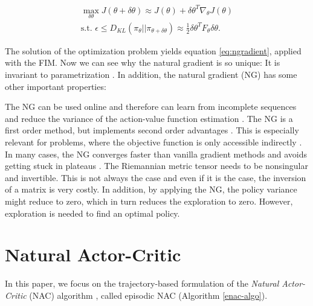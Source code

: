 \begin{align}
	\max_{\delta\theta} J(\theta + \delta\theta) \approx J(\theta) + \delta\theta^T\nabla_\theta J(\theta)\label{ng1}\\
	\text{s.t. } \epsilon \le D_{KL}(\pi_{\theta} || \pi_{\theta + \delta\theta}) \approx \tfrac{1}{2} \delta\theta^T F_\theta \delta\theta\label{ng2}.
\end{align}

\noindent The solution of the optimization problem yields equation \ref{eq:ngradient}, applied with the FIM. Now we can see why the natural gradient is so unique: It is invariant to parametrization \citep{pascanu2013revisiting, peters2008natural}. In addition, the natural gradient (NG) has some other important properties:

\begin{itemize}
	\x {} The NG can be used online and therefore can learn from incomplete sequences and reduce the variance of the action-value function estimation \cite{pascanu2013revisiting, peters2008natural}.
	\x {} The NG is a first order method, but implements second order advantages \cite{pascanu2013revisiting}. This is especially relevant for problems, where the objective function is only accessible indirectly \cite{desjardins2013metric}.
	\x {} In many cases, the NG converges faster than vanilla gradient methods and avoids getting stuck in plateaus \cite{amari1998efficiently, sohl2012natural}.
	\x {} The Riemannian metric tensor needs to be nonsingular and invertible. This is not always the case and even if it is the case, the inversion of a matrix is very costly. In addition, by applying the NG, the policy variance might reduce to zero, which in turn reduces the exploration to zero. However, exploration is needed to find an optimal policy.
\end{itemize}

\section{Natural Actor-Critic}
\label{sec:nac}
In this paper, we focus on the trajectory-based formulation of the \textit{Natural Actor-Critic} (NAC) algorithm \citep{peters2005natural}, called episodic NAC (Algorithm \ref{enac-algo}).

